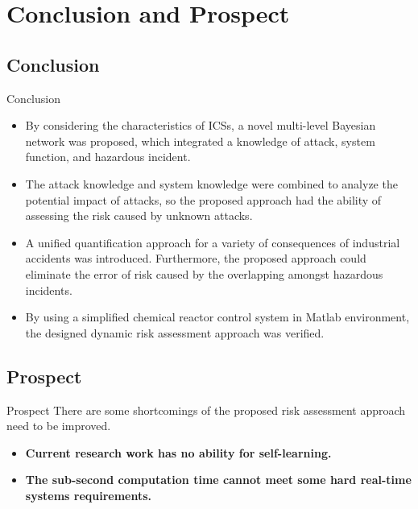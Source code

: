 \section{Conclusion and Prospect}
\subsection{Conclusion}
\begin{frame}{Conclusion}
\begin{itemize}[<+->]
  \item By considering the characteristics of ICSs, a novel multi-level Bayesian network was proposed, which integrated a knowledge of attack, system function, and hazardous incident.
  \item The attack knowledge and system knowledge were combined to analyze the potential impact of attacks, so the proposed approach had the ability of assessing the risk caused by unknown attacks.
  \item A unified quantification approach for a variety of consequences of industrial accidents was introduced. Furthermore, the proposed approach could eliminate the error of risk caused by the overlapping amongst hazardous incidents.
  \item By using a simplified chemical reactor control system in Matlab environment, the designed dynamic risk assessment approach was verified.
\end{itemize}
\end{frame}

\subsection{Prospect}
\begin{frame}{Prospect}
    There are some shortcomings of the proposed risk assessment approach need to be improved.
    \begin{itemize}[<+->]
      \item \textbf{Current research work has no ability for self-learning.} 
      \item \textbf{The sub-second computation time cannot meet some hard real-time systems requirements.}
    \end{itemize}
\end{frame}

